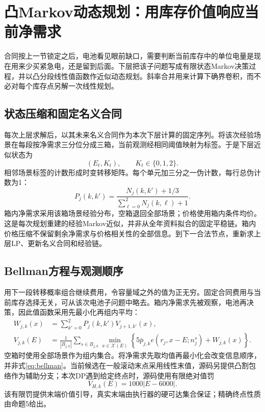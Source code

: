 \documentclass[UTF8,a4paper,zihao=-4,fontset=mac]{ctexart}
\begin{document}
\section{凸Markov动态规划：用库存价值响应当前净需求}
合同按上一节锁定之后，电池看见眼前缺口，需要判断当前库存中的单位电量是现在用来少买紧急电，还是留到后面。下层把该子问题写成有限状态Markov决策过程\cite{puterman1994}，并以凸分段线性值函数作近似动态规划\cite{powell2011}。斜率合并用来计算下确界卷积，而不必对每个库存点另解一次线性规划。

\subsection{状态压缩和固定名义合同}
每次上层求解后，以其未来名义合同作为本次下层计算的固定序列。将该次经验场景在每段按净需求三分位分成三箱，当前观测经相同阈值映射为标签。于是下层近似状态为
\begin{equation}
 (E_t,K_t),\qquad K_t\in\{0,1,2\}.
\end{equation}
相邻场景标签的计数形成时变转移矩阵。每个单元加三分之一伪计数，每行总伪计数为1：
\begin{equation}\label{eq:transition}
 P_j(k,k')=\frac{N_j(k,k')+1/3}{\sum_{\ell=0}^2N_j(k,\ell)+1}.
\end{equation}
箱内净需求采用该箱场景经验分布，空箱退回全部场景；价格使用箱内条件均价。这是每次规划重建的经验Markov近似，并非从全年资料拟合的固定平稳链。箱内价格压缩不保留剩余净需求与价格相关性的全部信息。到下一合法节点，重新求上层LP、更新名义合同和经验链。

\subsection{Bellman方程与观测顺序}
用下一段转移概率组合继续费用，令容量域之外的值为正无穷。固定合同费用与当前库存选择无关，可从该次电池子问题中略去。箱内净需求先被观察，电池再决策，因此值函数采用先最小化再组内平均：
\begin{align}
 W_{j,k}(x)&=\sum_{k'=0}^2P_j(k,k')V_{j+1,k'}(x),\label{eq:w}\\
 V_{j,k}(E)&=\frac1{|B_{j,k}|}\sum_{s\in B_{j,k}}
 \min_{x\in\mathcal X(E)}\left\{5\bar p_{j,k}e(r_j,x-E;n_j^s)+W_{j,k}(x)\right\}.
 \label{eq:bellman}
\end{align}
空箱时使用全部场景作为组内集合。将净需求先取均值再最小化会改变信息顺序，并非式\eqref{eq:bellman}。当前候选在一般滚动末点采用线性末值，源码另提供凸割包络作为辅助分支；本次DP遇到给定终点时，源码使用有限绝对值罚
\begin{equation}\label{eq:penalty}
 V_{H,k}(E)=1000|E-6000|.
\end{equation}
该有限罚提供末端价值引导，真实末端由执行器的硬可达集合保证；精确终点性质由命题5给出。
\end{document}
